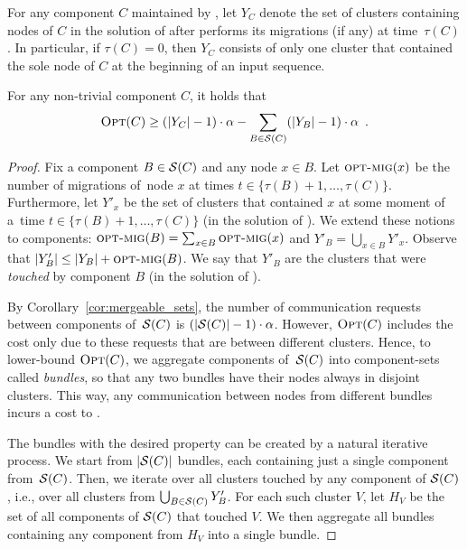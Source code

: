 For any component $C$ maintained by \CREP, let $Y_C$ denote the set of clusters
containing nodes of $C$ in the solution of \OPT after \OPT performs its
migrations (if any) at time~$\tau(C)$. In particular, if $\tau(C) = 0$, then
$Y_C$ consists of only one cluster that contained the sole node of $C$ 
at the beginning of an input sequence.

\begin{lemma}
\label{lem:opt_recursive_bound}
For any non-trivial component $C$, it holds that \[
\textsc{Opt}(C) \geq (|Y_C| - 1)
\cdot \alpha - \sum_{B \in \mathcal{S}(C)} (|Y_B| - 1) \cdot \alpha\enspace.
\]
\end{lemma}

\begin{proof}
Fix a component $B \in \mathcal{S}(C)$ and any node $x \in B$. Let $\textsc{opt-mig}(x)$ be the
number of \OPT migrations of~node $x$ at times $t \in \{ \tau(B)+1, \ldots,
\tau(C) \}$. Furthermore, let $Y'_x$ be the set of clusters that
contained $x$ at some moment of a~time $t \in \{ \tau(B)+1, \ldots, \tau(C)
\}$ (in the solution of \OPT). We extend these notions to components:
$\textsc{opt-mig}(B) = \sum_{x \in B} \textsc{opt-mig}(x)$ and $Y'_B = \bigcup_{x \in B} Y'_x$.
Observe that $|Y'_B| \leq |Y_B| + \textsc{opt-mig}(B)$.
We say that $Y'_B$ are the clusters that were \emph{touched} by component $B$ 
(in the solution of \OPT).

By Corollary~\ref{cor:mergeable_sets}, the number of communication requests between
components of~$\mathcal{S}(C)$ is $(|\mathcal{S}(C)|-1) \cdot \alpha$. However, $\textsc{Opt}(C)$
includes the cost only due to these requests that are between different clusters.
Hence, to lower-bound $\textsc{Opt}(C)$, we aggregate components of~$\mathcal{S}(C)$ into
component-sets called \emph{bundles}, so that any two bundles have their nodes
always in disjoint clusters. This way, any communication between nodes from
different bundles incurs a cost to \OPT.

The bundles with the desired property can be created by a natural iterative 
process. We start from $|\mathcal{S}(C)|$ bundles, each containing just a single 
component from~$\mathcal{S}(C)$. Then, we iterate over all clusters touched 
by any component of $\mathcal{S}(C)$, i.e., over all clusters from $\bigcup_{B \in \mathcal{S}(C)} Y'_B$.
For each such cluster $V$, let $H_V$ be the set 
of all components of $\mathcal{S}(C)$ that touched $V$. We then aggregate all bundles 
containing any component from $H_V$ into a single bundle.


\end{proof}
